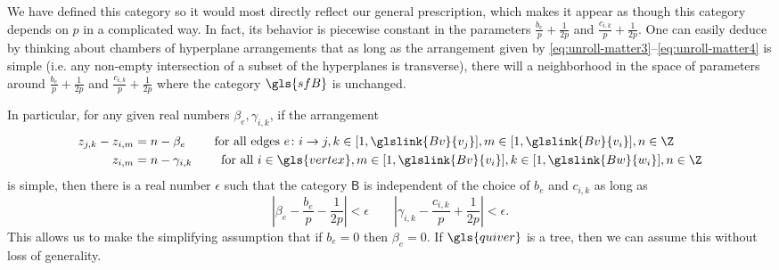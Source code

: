 We have defined this category so it would most directly reflect our
general prescription, which makes it appear as though this category depends on $p$ in a complicated way. In
fact, its behavior is piecewise constant in the parameters
$\frac{b_e}{p}+\frac{1}{2p}$ and $\frac{c_{i,k}}{p}+\frac{1}{2p}$.   One can
easily deduce by thinking about chambers of hyperplane arrangements
that as long as the arrangement given by
\eqref{eq:unroll-matter3}--\eqref{eq:unroll-matter4} is simple (i.e. any non-empty intersection of a subset of the hyperplanes is transverse),
there will a neighborhood in the space of parameters around
$\frac{b_e}{p}+\frac{1}{2p}$ and $\frac{c_{i,k}}{p}+\frac{1}{2p}$ where the
category $\gls{sfB}$ is unchanged.

In particular, for any given real numbers $\beta_e, \gamma_{i,k}$, if
the arrangement \begin{align*}%
z_{j,k}-z_{i,m}&=n-\beta_e\qquad \text{ for all edges } e\colon i\to j,
  k\in [1,\glslink{Bv}{v_j}], m\in [1,\glslink{Bv}{v_i}], n\in \Z\\
z_{i,m}&=n-\gamma_{i,k}\qquad \text{ for all }
                 i\in {\gls{vertex}}, m\in [1,\glslink{Bv}{v_i}], k\in [1,\glslink{Bw}{w_i}], n\in \Z
\end{align*} is simple, then there is a real number $\epsilon$ such
that the category $\mathsf{B}$ is independent of the choice of $b_e$
and $c_{i,k}$ as long as 
\[|\beta_e-\frac{b_e}{p}-\frac{1}{2p}|<\epsilon\qquad
  |\gamma_{i,k}-\frac{c_{i,k}}{p}+\frac{1}{2p}|<\epsilon.\]  This allows us
to make the simplifying assumption that if $b_e=0$ then $\beta_e=0$.
If $\gls{quiver}$ is a tree, then we can assume this without loss of
generality. 
